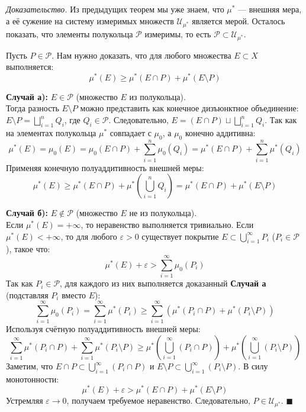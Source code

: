\documentclass[12pt,a4paper]{article}
\newenvironment{Proof}[1][Доказательство]{\vspace{0.5em}\noindent\textit{#1.}\hspace{0.5em}\ignorespaces}{\hfill$\blacksquare$\vspace{1em}}
\begin{document}
\begin{Proof}
Из предыдущих теорем мы уже знаем, что $\mu^*$ — внешняя мера, а её сужение на систему измеримых множеств $\mathcal{U}_{\mu^*}$ является мерой. Осталось показать, что элементы полукольца $\mathcal{P}$ измеримы, то есть $\mathcal{P} \subset \mathcal{U}_{\mu^*}$.

Пусть $P \in \mathcal{P}$. Нам нужно доказать, что для любого множества $E \subset X$ выполняется:
$$ \mu^*(E) \ge \mu^*(E \cap P) + \mu^*(E \setminus P) $$

\textbf{Случай а):} $E \in \mathcal{P}$ (множество $E$ из полукольца). \\
Тогда разность $E \setminus P$ можно представить как конечное дизъюнктное объединение: $E \setminus P = \bigsqcup\limits_{i=1}^n Q_i$, где $Q_i \in \mathcal{P}$. 
Следовательно, $E = (E \cap P) \sqcup \bigsqcup\limits_{i=1}^n Q_i$.
Так как на элементах полукольца $\mu^*$ совпадает с $\mu_0$, а $\mu_0$ конечно аддитивна:
$$ \mu^*(E) = \mu_0(E) = \mu_0(E \cap P) + \sum\limits_{i=1}^n \mu_0(Q_i) = \mu^*(E \cap P) + \sum\limits_{i=1}^n \mu^*(Q_i) $$
Применяя конечную полуаддитивность внешней меры:
$$ \mu^*(E) \ge \mu^*(E \cap P) + \mu^* \left( \bigcup\limits_{i=1}^n Q_i \right) = \mu^*(E \cap P) + \mu^*(E \setminus P) $$

\textbf{Случай б):} $E \notin \mathcal{P}$ (множество $E$ не из полукольца). \\
Если $\mu^*(E) = +\infty$, то неравенство выполняется тривиально. 
Если $\mu^*(E) < +\infty$, то для любого $\varepsilon > 0$ существует покрытие $E \subset \bigcup\limits_{i=1}^{\infty} P_i$ ($P_i \in \mathcal{P}$), такое что:
$$ \mu^*(E) + \varepsilon > \sum\limits_{i=1}^{\infty} \mu_0(P_i) $$
Так как $P_i \in \mathcal{P}$, для каждого из них выполняется доказанный \textbf{Случай а} (подставляя $P_i$ вместо $E$):
$$ \sum\limits_{i=1}^{\infty} \mu_0(P_i) = \sum\limits_{i=1}^{\infty} \mu^*(P_i) \ge \sum\limits_{i=1}^{\infty} \left( \mu^*(P_i \cap P) + \mu^*(P_i \setminus P) \right) $$
Используя счётную полуаддитивность внешней меры:
$$ \sum\limits_{i=1}^{\infty} \mu^*(P_i \cap P) + \sum\limits_{i=1}^{\infty} \mu^*(P_i \setminus P) \ge \mu^* \left( \bigcup\limits_{i=1}^{\infty} (P_i \cap P) \right) + \mu^* \left( \bigcup\limits_{i=1}^{\infty} (P_i \setminus P) \right) $$
Заметим, что $E \cap P \subset \bigcup\limits_{i=1}^{\infty} (P_i \cap P)$ и $E \setminus P \subset \bigcup\limits_{i=1}^{\infty} (P_i \setminus P)$. В силу монотонности:
$$ \mu^*(E) + \varepsilon > \mu^*(E \cap P) + \mu^*(E \setminus P) $$
Устремляя $\varepsilon \to 0$, получаем требуемое неравенство. Следовательно, $P \in \mathcal{U}_{\mu^*}$.
\end{Proof}
\end{document}
